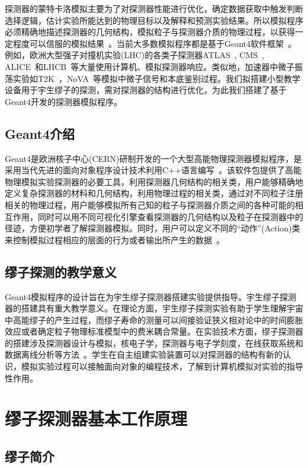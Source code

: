 \documentclass[aps,prd,superscriptaddress,nofootinbib,preprint]{ctexart}
\begin{document}
\begin{CJK}{UTF8}{gbsn}
探测器的蒙特卡洛模拟主要为了对探测器性能进行优化，确定数据获取中触发判断选择逻辑，估计实验所能达到的物理目标以及解释和预测实验结果。所以模拟程序必须精确地描述探测器的几何结构，模拟粒子与探测器介质的物理过程，以获得一定程度可以信服的模拟结果~\cite{7}。当前大多数模拟程序都是基于Geant4软件框架~\cite{Agostinelli:2002hh}。例如，欧洲大型强子对撞机实验(LHC)的各类子探测器ATLAS~\cite{Aad:2010ah}, CMS~\cite{Abdullin:2011zz}, ALICE~\cite{Hrivnacova:2011zz}和LHCB~\cite{Clemencic:2011zza}等大量使用计算机、模拟探测器响应。类似地，加速器中微子振荡实验如T2K~\cite{Abe:2011ks}，NoVA~\cite{Ayres:2004js}等模拟中微子信号和本底鉴别过程。我们拟搭建小型教学设备用于宇生缪子的探测，需对探测器的结构进行优化，为此我们搭建了基于Geant4开发的探测器模拟程序。

\subsection{Geant4介绍}

Geant4是欧洲核子中心(CERN)研制开发的一个大型高能物理探测器模拟程序，是采用当代先进的面向对象程序设计技术利用C++语言编写~\cite{1}。该软件包提供了高能物理模拟实验探测器的必要工具，利用探测器几何结构的相关类，用户能够精确地定义复杂探测器的材料和几何结构，利用物理过程的相关类，通过对不同粒子注册相关的物理过程，用户能够模拟所有己知的粒子与探测器介质之间的各种可能的相互作用，同时可以用不同可视化引擎查看探测器的几何结构以及粒子在探测器中的径迹，方便初学者了解探测器模拟。同时，用户可以定义不同的“动作”(Action)类来控制模拟过程相应的层面的行为或者输出所产生的数据~\cite{7}。

\subsection{缪子探测的教学意义}

Geant4模拟程序的设计旨在为宇生缪子探测器搭建实验提供指导。宇生缪子探测器的搭建具有重大教学意义。在理论方面，宇生缪子探测实验有助于学生理解宇宙中高能缪子的产生过程，而缪子寿命的测量可以间接验证狭义相对论中的时间膨胀效应或者确定粒子物理标准模型中的费米耦合常量。在实验技术方面，缪子探测器的搭建涉及探测器设计与模拟，核电子学，探测器与电子学刻度，在线获取系统和数据离线分析等方法~\cite{2}。学生在自主组建实验装置可以对探测器的结构有新的认识，模拟实验过程可以接触面向对象的编程技术，了解到计算机模拟对实验的指导性作用。
\section{缪子探测器基本工作原理}
\subsection{缪子简介}


\end{CJK}
\end{document}
